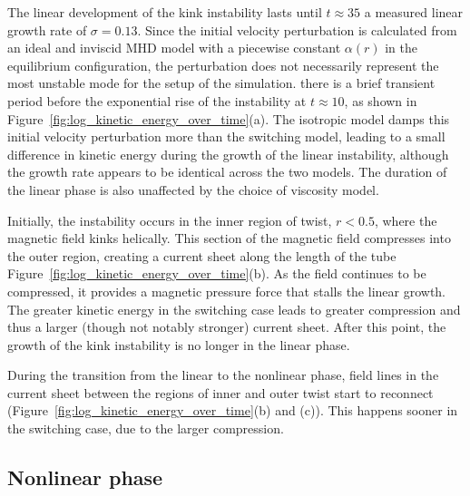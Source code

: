 The linear development of the kink instability lasts until $t\approx
35$  a
measured linear growth rate of $\sigma = 0.13$. Since the initial
velocity perturbation is calculated from an ideal and inviscid MHD
model with a piecewise constant $\alpha(r)$ in the equilibrium
configuration, the perturbation does not necessarily represent the
most unstable mode for the setup of the simulation.  there is a brief transient period before the exponential rise of the instability at $t\approx10$, as shown in Figure~\ref{fig:log_kinetic_energy_over_time}(a). The isotropic model damps this initial velocity perturbation more than the switching model, leading to a small difference in kinetic energy during the growth of the linear instability, although the growth rate appears to be identical across the two models. The duration of the linear phase is also unaffected by the choice of viscosity model.

Initially, the instability occurs in the inner region of twist,
$r<0.5$, where the magnetic field kinks helically. This section of the
magnetic field compresses into the outer region, creating a current
sheet along the length of the tube  Figure~\ref{fig:log_kinetic_energy_over_time}(b). As the field continues to be compressed, it provides a magnetic pressure force that stalls the linear growth. The greater kinetic energy in the switching case leads to greater compression and thus a larger (though not notably stronger) current sheet. After this point, the growth of the kink instability is no longer in the linear phase.

During the transition from the linear to the nonlinear phase, field lines in the current sheet between the regions of inner and outer twist start to reconnect (Figure~\ref{fig:log_kinetic_energy_over_time}(b) and (c)). This happens sooner in the switching case, due to the larger compression.

\subsection{Nonlinear phase}

